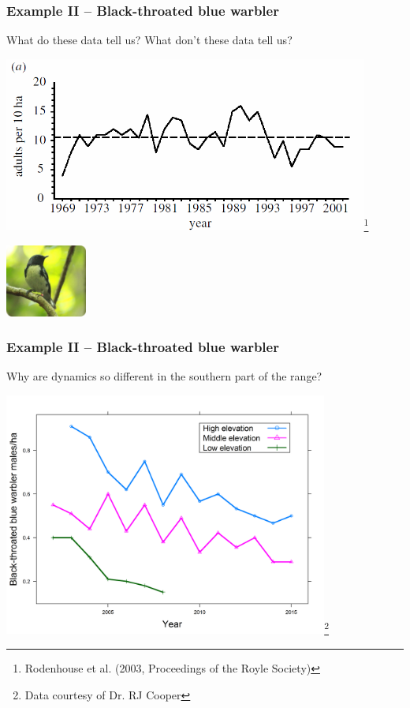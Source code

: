 \documentclass[color=usenames,dvipsnames]{beamer}
\begin{document}
\begin{frame}[fragile]
  \frametitle{Example II -- Black-throated blue warbler}
  {\centering \large
    What do these data tell us?
    What don't these data tell us? \par}
\begin{center}
  \includegraphics[width=0.9\textwidth]{figs/btbw}\let\thefootnote\relax\footnote{\tiny Rodenhouse et
    al. (2003, Proceedings of the Royle Society)} \\
\end{center}
\hfill \includegraphics[width=0.2\textwidth]{figs/btbw1}
\end{frame}




\begin{frame}[fragile]
  \frametitle{Example II -- Black-throated blue warbler}
  {\centering \small %
    Why are dynamics so different in the southern part of
    the range? \\}
\begin{center}
\includegraphics[width=0.8\textwidth]{figs/blue_density3plots}\let\thefootnote\relax\footnote{\tiny
    Data courtesy of Dr. RJ Cooper} 
\end{center}
\end{frame}
\end{document}
